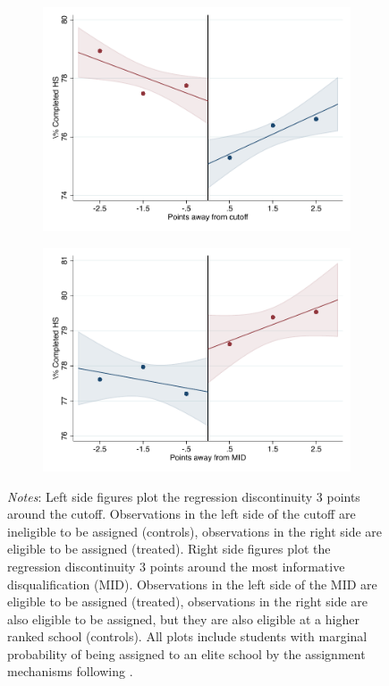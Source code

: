 \documentclass[oneside,11pt]{article}
\begin{document}
\begin{figure}[H]
\begin{center}
    \begin{subfigure}{0.475\textwidth}
        \centering
        \includegraphics[width=\textwidth]{04_Figures/rd_plot_tau_bachillerato_mas_IPN3.pdf}
    \end{subfigure}
    \begin{subfigure}{0.475\textwidth}
        \centering
        \includegraphics[width=\textwidth]{04_Figures/rd_plot_mid_bachillerato_mas_IPN3.pdf}
    \end{subfigure}
    \end{center}
    
\footnotesize
\textit{Notes}: Left side figures plot the regression discontinuity 3 points around the cutoff. Observations in the left side of the cutoff are ineligible to be assigned (controls), observations in the right side are eligible to be assigned (treated). Right side figures plot the regression discontinuity 3 points around the most informative disqualification (MID). Observations in the left side of the MID are eligible to be assigned (treated), observations in the right side are also eligible to be assigned, but they are also eligible at a higher ranked school (controls). All plots include students with marginal probability of being assigned to an elite school by the assignment mechanisms following \citet{abdulkadirouglu2022breaking}. 
\end{figure}
\end{document}
